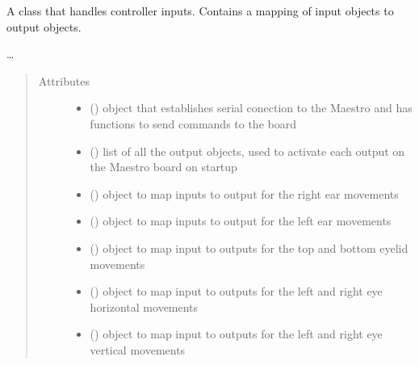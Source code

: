 \documentclass[letterpaper,10pt,english]{sphinxmanual}
\begin{document}
\begin{fulllineitems}
\label{\detokenize{movementmap:MovementMap.MovementMap}}
\sphinxAtStartPar
A class that handles controller inputs. Contains a mapping of input 
objects to output objects.

\sphinxAtStartPar
…
\begin{quote}\begin{description}
\item[{Attributes}] \leavevmode\begin{itemize}
\item {} 
\sphinxAtStartPar
{}() \textendash{} object that 
establishes serial conection to the Maestro and has functions 
to send commands to the board

\item {} 
\sphinxAtStartPar
{}(\sphinxstyleemphasis{{[}OutputObject{]}}) \textendash{} list of all the 
output objects, used to activate each output on the Maestro 
board on startup

\item {} 
\sphinxAtStartPar
{}() \textendash{} object to map 
inputs to output for the right ear movements

\item {} 
\sphinxAtStartPar
{}() \textendash{} object to map 
inputs to output for the left ear movements

\item {} 
\sphinxAtStartPar
{}() \textendash{} object to map input 
to outputs for the top and bottom eyelid movements

\item {} 
\sphinxAtStartPar
{}() \textendash{} object to 
map input to outputs for the left and right eye horizontal 
movements

\item {} 
\sphinxAtStartPar
{}() \textendash{} object to map 
input to outputs for the left and right eye vertical movements


\end{itemize}
\end{description}
\end{quote}
\end{fulllineitems}
\end{document}
